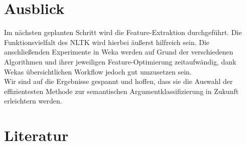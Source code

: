 \documentclass[runningheads]{llncs}
\begin{document}
\section{Ausblick}
Im n\"achsten geplanten Schritt wird die Feature-Extraktion durchgef\"uhrt. Die Funktionsvielfalt des NLTK wird hierbei \"au\ss{}erst hilfreich sein. Die anschlie\ss{}enden Experimente in Weka werden auf Grund der verschiedenen Algorithmen und ihrer jeweiligen Feature-Optimierung zeitaufw\"andig, dank Wekas \"ubersichtlichen Workflow jedoch gut umzusetzen sein.\\
Wir sind auf die Ergebnisse gespannt und hoffen, dass sie die Auswahl der effizientesten Methode zur semantischen Argumentklassifizierung in Zukunft erleichtern werden.

\section{Literatur}
{}

\end{document}
